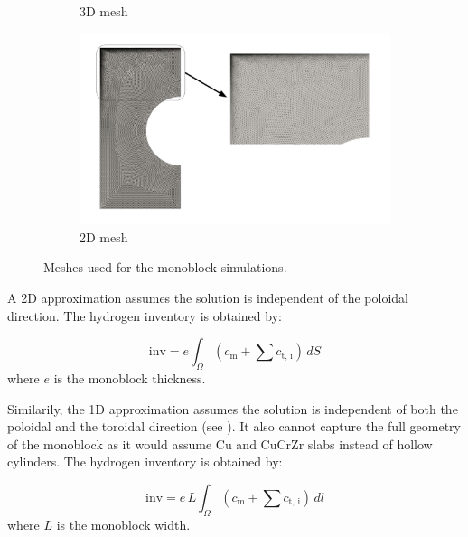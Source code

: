 \begin{figure}
\begin{subfigure}{0.27\linewidth}
        \caption{3D mesh}
    \end{subfigure}%
    \begin{subfigure}{0.73\linewidth}
        \includegraphics[width=\linewidth]{Figures/Chapter3/monoblocks/mesh_2d.pdf}
        \caption{2D mesh}
    \end{subfigure}
    \caption{Meshes used for the monoblock simulations.}
\end{figure}

A 2D approximation assumes the solution is independent of the poloidal direction.
The hydrogen inventory is obtained by:

\begin{equation}
    \mathrm{inv} = e \int_\Omega (c_\mathrm{m} + \sum c_\mathrm{t,\, i}) \, dS
\end{equation}
where $e$ is the monoblock thickness.

Similarily, the 1D approximation assumes the solution is independent of both the poloidal and the toroidal direction (see ).
It also cannot capture the full geometry of the monoblock as it would assume Cu and CuCrZr slabs instead of hollow cylinders.
The hydrogen inventory is obtained by:

\begin{equation}
    \mathrm{inv} = e \, L \int_\Omega (c_\mathrm{m} + \sum c_\mathrm{t,\, i}) \, dl
\end{equation}
where $L$ is the monoblock width.

